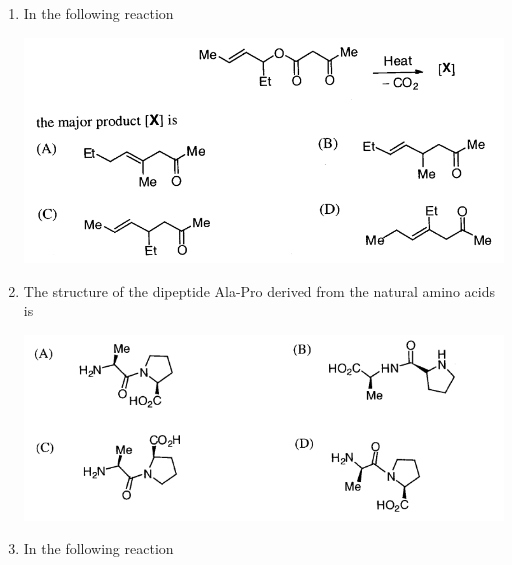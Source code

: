 \documentclass[journal,12pt,onecolumn]{IEEEtran}
\theoremstyle{remark}
\begin{document}
\begin{enumerate}
\begin{multicols}{2}
\begin{itemize}[label=(A)]
    \item 5'-AGGUUAGGCU-3'
    \item 5'-UCGAUGUGA-3'
    \item 5'-AGTGTAGCT-3'
    \item 5'-TCGATGTGA-3'
\end{itemize}
\end{multicols}
 

\item    \hspace{0.5cm} In the following reaction  \hfill{}

\begin{center}
\includegraphics[width=\textwidth]{figs/image7.png} %
\end{center}
 

\item    \hspace{0.5cm} The structure of the dipeptide Ala-Pro derived from the natural amino acids is  \hfill{}

\includegraphics[width=\linewidth]{figs/image8.png}
 

\item    \hspace{0.5cm} In the following reaction  \hfill{}


\end{enumerate}
\end{document}
